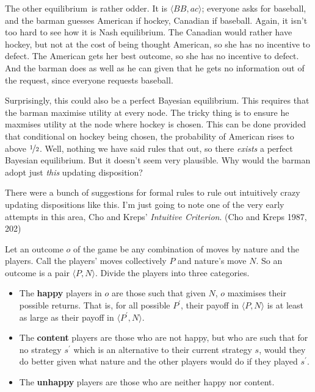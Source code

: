 \documentclass[
  11pt,
  letterpaper,
]{scrbook}
\providecommand{\tightlist}{%
  \setlength{\itemsep}{0pt}\setlength{\parskip}{0pt}}
\begin{document}
The other equilibrium~is rather odder. It is \(\langle BB, ac \rangle\);
everyone asks for baseball, and the barman guesses American if hockey,
Canadian if baseball. Again, it isn't too hard to see how it is Nash
equilibrium. The Canadian would rather have hockey, but not at the cost
of being thought American, so she has no incentive to defect. The
American gets her best outcome, so she has no incentive to defect. And
the barman does as well as he can given that he gets no information out
of the request, since everyone requests baseball.

Surprisingly, this could also be a perfect Bayesian equilibrium. This
requires that the barman maximise utility at every node. The tricky
thing is to ensure he maxmises utility at the node where hockey is
chosen. This can be done provided that conditional on hockey being
chosen, the probability of American rises to above \(\nicefrac{1}{2}\).
Well, nothing we have said rules that out, so there \emph{exists} a
perfect Bayesian equilibrium. But it doesn't seem very plausible. Why
would the barman adopt just \emph{this} updating disposition?

There were a bunch of suggestions for formal rules to rule out
intuitively crazy updating dispositions like this. I'm just going to
note one of the very early attempts in this area, Cho and Kreps'
\emph{Intuitive Criterion}. (Cho and Kreps 1987, 202)

Let an outcome \(o\) of the game be any combination of moves by nature
and the players. Call the players' moves collectively \(P\) and nature's
move \(N\). So an outcome is a pair \(\langle P, N \rangle\). Divide the
players into three categories.

\begin{itemize}
\tightlist
\item
  The \textbf{happy} players in \(o\) are those such that given \(N\),
  \(o\) maximises their possible returns. That is, for all possible
  \(P^\prime\), their payoff in \(\langle P, N \rangle\) is at least as
  large as their payoff in \(\langle P^\prime, N \rangle\).
\item
  The \textbf{content} players are those who are not happy, but who are
  such that for no strategy \(s^\prime\) which is an alternative to
  their current strategy \(s\), would they do better given what nature
  and the other players would do if they played \(s^\prime\).
\item
  The \textbf{unhappy} players are those who are neither happy nor
  content.
\end{itemize}
\end{document}
